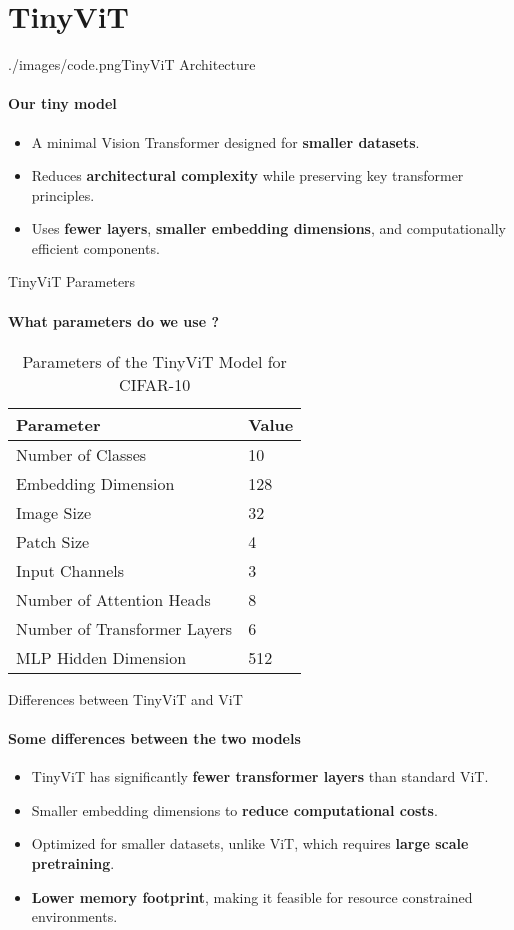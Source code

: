 \section{TinyViT}

\begin{sidepic}{./images/code.png}{TinyViT Architecture}
  \framesubtitle{Our tiny model}
  \begin{itemize}
    \item A minimal Vision Transformer designed for \textbf{smaller datasets}.
    \item Reduces \textbf{architectural complexity} while preserving key transformer principles.
    \item Uses \textbf{fewer layers}, \textbf{smaller embedding dimensions}, and computationally efficient components.
  \end{itemize}
\end{sidepic}

\begin{frame}[fragile]{TinyViT Parameters}
  \framesubtitle{What parameters do we use ?}
  \begin{table}[htbp]
    \small
    \centering
    \caption{Parameters of the TinyViT Model for CIFAR-10}
    \begin{tabular}{@{}ll@{}}
      \toprule
      \textbf{Parameter} & \textbf{Value} \\
      \midrule
      Number of Classes & 10 \\
      Embedding Dimension & 128 \\
      Image Size & 32 \\
      Patch Size & 4 \\
      Input Channels & 3 \\
      Number of Attention Heads & 8 \\
      Number of Transformer Layers & 6 \\
      MLP Hidden Dimension & 512 \\
      \bottomrule
    \end{tabular}
  \end{table}
\end{frame}

\begin{frame}{Differences between TinyViT and ViT}
  \framesubtitle{Some differences between the two models}
  \begin{itemize}
    \item TinyViT has significantly \textbf{fewer transformer layers} than standard ViT.
    \item Smaller embedding dimensions to \textbf{reduce computational costs}.
    \item Optimized for smaller datasets, unlike ViT, which requires \textbf{large scale pretraining}.
    \item \textbf{Lower memory footprint}, making it feasible for resource constrained environments.
  \end{itemize}
\end{frame}
